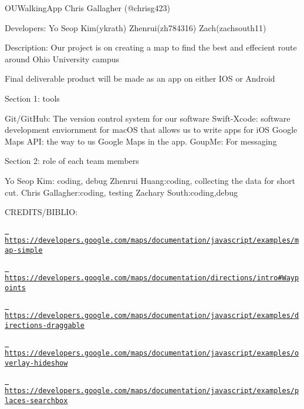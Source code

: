 O\+U\+Walking\+App Chris Gallagher (@chrisg423)

Developers\+: Yo Seop Kim(ykrath) Zhenrui(zh784316) Zach(zachsouth11)

Description\+: Our project is on creating a map to find the best and effecient route around Ohio University campus

Final deliverable product will be made as an app on either I\+OS or Android

Section 1\+: tools

Git/\+Git\+Hub\+: The version control system for our software Swift-\/\+Xcode\+: software development enviornment for mac\+OS that allows us to write apps for i\+OS Google Maps A\+PI\+: the way to us Google Maps in the app. Goup\+Me\+: For messaging

Section 2\+: role of each team members

Yo Seop Kim\+: coding, debug Zhenrui Huang\+:coding, collecting the data for short cut. Chris Gallagher\+:coding, testing Zachary South\+:coding,debug

C\+R\+E\+D\+I\+T\+S/\+B\+I\+B\+L\+IO\+:

\href{https://developers.google.com/maps/documentation/javascript/examples/map-simple}{\texttt{ https\+://developers.\+google.\+com/maps/documentation/javascript/examples/map-\/simple}}

\href{https://developers.google.com/maps/documentation/directions/intro\#Waypoints}{\texttt{ https\+://developers.\+google.\+com/maps/documentation/directions/intro\#\+Waypoints}}

\href{https://developers.google.com/maps/documentation/javascript/examples/directions-draggable}{\texttt{ https\+://developers.\+google.\+com/maps/documentation/javascript/examples/directions-\/draggable}}

\href{https://developers.google.com/maps/documentation/javascript/examples/overlay-hideshow}{\texttt{ https\+://developers.\+google.\+com/maps/documentation/javascript/examples/overlay-\/hideshow}}

\href{https://developers.google.com/maps/documentation/javascript/examples/places-searchbox}{\texttt{ https\+://developers.\+google.\+com/maps/documentation/javascript/examples/places-\/searchbox}} 